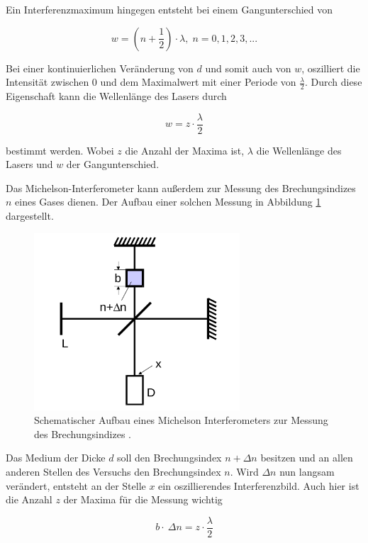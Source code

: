 Ein Interferenzmaximum hingegen entsteht bei einem Gangunterschied von

\begin{equation*}
  w = (n + \frac{1}{2})\cdot \lambda, \; n = 0, 1, 2, 3, ...
\end{equation*}

Bei einer kontinuierlichen Veränderung von $d$ und somit auch von $w$, oszilliert die Intensität zwischen 0 und dem Maximalwert mit einer Periode von $\frac{\lambda}{2}$.
Durch diese Eigenschaft kann die Wellenlänge des Lasers durch

\begin{equation*}
  w = z \cdot \frac{\lambda}{2}
\end{equation*}

bestimmt werden. Wobei $z$ die Anzahl der Maxima ist, $\lambda$ die Wellenlänge des Lasers und $w$ der Gangunterschied.

Das Michelson-Interferometer kann außerdem zur Messung des Brechungsindizes $n$ eines Gases dienen. Der Aufbau einer solchen Messung in Abbildung \ref{Abb:2} dargestellt.

\begin{figure}
  \centering
  \includegraphics[scale = 0.5]{V401-Bild2.png}
  \caption{Schematischer Aufbau eines Michelson Interferometers zur Messung des Brechungsindizes \cite{Q1}.}
  \label{Abb:2}
\end{figure}

Das Medium der Dicke $d$ soll den Brechungsindex $ n + \Delta n$ besitzen und an allen anderen Stellen des Versuchs den Brechungsindex $n$. Wird $\Delta n$ nun langsam verändert,
entsteht an der Stelle $x$ ein oszillierendes Interferenzbild. Auch hier ist die Anzahl $z$ der Maxima für die Messung wichtig

\begin{equation}
  b \cdot \ \Delta n = z \cdot \frac{\lambda}{2}
\end{equation}

